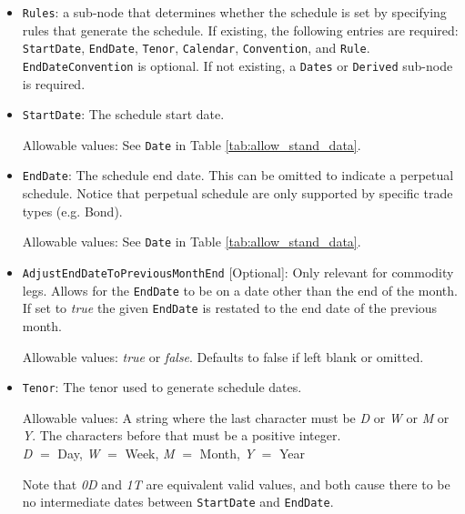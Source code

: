 \begin{itemize}
\item \lstinline!Rules!: a sub-node that determines whether the schedule is set by specifying rules that
generate the schedule. If existing, the following entries are required: \lstinline!StartDate!, \lstinline!EndDate!, \lstinline!Tenor!, \lstinline!Calendar!, 
\lstinline!Convention!, and \lstinline!Rule!. \lstinline!EndDateConvention! is optional. If not existing, a \lstinline!Dates! or \lstinline!Derived!
sub-node is required.
\item \lstinline!StartDate!:  The schedule start date.  

Allowable values:  See \lstinline!Date! in Table \ref{tab:allow_stand_data}.

\item \lstinline!EndDate!: The schedule end date. This can be omitted to indicate a perpetual schedule. Notice that perpetual
  schedule are only supported by specific trade types (e.g. Bond).

Allowable values:  See \lstinline!Date! in Table \ref{tab:allow_stand_data}.

\item \lstinline!AdjustEndDateToPreviousMonthEnd! [Optional]: Only relevant for commodity legs. Allows for the \lstinline!EndDate! to be on a date other than the end of the month. If set to \emph{true} the given \lstinline!EndDate! is restated to the end date of the previous month.

Allowable values: \emph{true} or \emph{false}. Defaults to false if left blank or omitted.

\item \lstinline!Tenor!: The tenor used to generate schedule dates. 

Allowable values: A string where the last character must be \emph{D} or \emph{W} or
\emph{M} or \emph{Y}.  The characters before that must be a positive integer. \\ \emph{D}
$=$ Day, \emph{W} $=$ Week, \emph{M} $=$ Month, \emph{Y} $=$ Year

Note that \emph{0D} and \emph{1T} are equivalent valid values, and both cause there to be no intermediate dates between \lstinline!StartDate! and \lstinline!EndDate!.


\end{itemize}
